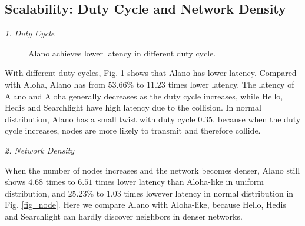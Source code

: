 \subsection{Scalability: Duty Cycle and Network Density}

\emph{1. Duty Cycle} 
\begin{figure}[!h]
\centering
{}
\hspace{0.01in}
\caption{Alano achieves lower latency in different duty cycle.}
\label{fig_dutycycle}
\end{figure}

With different duty cycles, Fig. \ref{fig_dutycycle} shows that Alano has lower latency. Compared with Aloha, Alano has from $53.66\%$ to $11.23$ times lower latency. The latency of Alano and Aloha generally decreases as the duty cycle increases, while Hello, Hedis and Searchlight have high latency due to the collision. In normal distribution, Alano has a small twist with duty cycle $0.35$, because when the duty cycle increases, nodes are more likely to transmit and therefore collide.

\emph{2. Network Density} 


When the number of nodes increases and the network becomes denser, Alano still shows $4.68$ times to $6.51$ times lower latency than Aloha-like in uniform distribution, and $25.23\%$ to $1.03$ times lowever latency in normal distribution in Fig. \ref{fig_node}. Here we compare Alano with Aloha-like, because Hello, Hedis and Searchlight can hardly discover neighbors in denser networks. 


